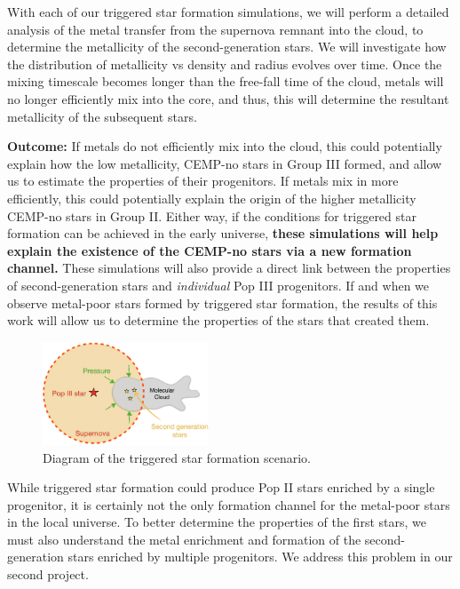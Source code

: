 \documentclass[a4paper, 12pt]{article}
\begin{document}
With each of our triggered star formation simulations, we will perform a detailed analysis of the metal transfer from the supernova remnant into the cloud, to determine the metallicity of the second-generation stars. We will investigate how the distribution of metallicity vs density and radius evolves over time. Once the mixing timescale becomes longer than the free-fall time of the cloud, metals will no longer efficiently mix into the core, and thus, this will determine the resultant metallicity of the subsequent stars. 

\textbf{Outcome:} If metals do not efficiently mix into the cloud, this could potentially explain how the low metallicity, CEMP-no stars in Group III formed, and allow us to estimate the properties of their progenitors. If metals mix in more efficiently, this could potentially explain the origin of the higher metallicity CEMP-no stars in Group II. Either way, if the conditions for triggered star formation can be achieved in the early universe, \textbf{these simulations will help explain the existence of the CEMP-no stars via a new formation channel.} These simulations will also provide a direct link between the properties of second-generation stars and \textit{individual} Pop III progenitors. If and when we observe metal-poor stars formed by triggered star formation, the results of this work will allow us to determine the properties of the stars that created them.


\begin{figure}
  \includegraphics[width=0.44\textwidth]{figures/tsf2}
  \caption{Diagram of the triggered star formation scenario.}
  \label{fig:tsf}
\end{figure}

While triggered star formation could produce Pop II stars enriched by a single progenitor, it is certainly not the only formation channel for the metal-poor stars in the local universe. To better determine the properties of the first stars, we must also understand the metal enrichment and formation of the second-generation stars enriched by multiple progenitors. We address this problem in our second project.
\end{document}
